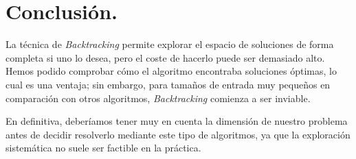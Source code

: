 \documentclass[11pt,a4paper]{article}
\begin{document}
	\section{Conclusión.}

		\par
		La técnica de \textit{Backtracking} permite explorar el espacio de soluciones de forma completa si uno lo desea, pero el coste de hacerlo puede ser demasiado alto. Hemos podido comprobar cómo el algoritmo encontraba soluciones óptimas, lo cual es una ventaja; sin embargo, para tamaños de entrada muy pequeños en comparación con otros algoritmos, \textit{Backtracking} comienza a ser inviable.

		\par
		En definitiva, deberíamos tener muy en cuenta la dimensión de nuestro problema antes de decidir resolverlo mediante este tipo de algoritmos, ya que la exploración sistemática no suele ser factible en la práctica.
\end{document}

